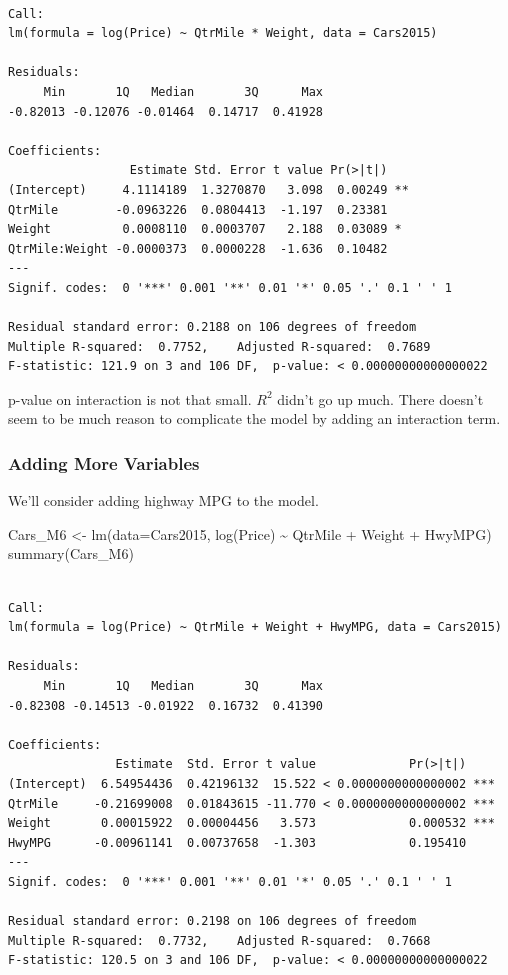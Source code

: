 \documentclass[
  letterpaper,
  DIV=11,
  numbers=noendperiod]{scrreprt}
\newenvironment{Shaded}{\begin{snugshade}}{\end{snugshade}}
\newcommand{\AttributeTok}[1]{\textcolor[rgb]{0.40,0.45,0.13}{#1}}
\newcommand{\FunctionTok}[1]{\textcolor[rgb]{0.28,0.35,0.67}{#1}}
\newcommand{\NormalTok}[1]{\textcolor[rgb]{0.00,0.23,0.31}{#1}}
\newcommand{\OtherTok}[1]{\textcolor[rgb]{0.00,0.23,0.31}{#1}}
\newcommand{\SpecialCharTok}[1]{\textcolor[rgb]{0.37,0.37,0.37}{#1}}
\begin{document}
\begin{verbatim}

Call:
lm(formula = log(Price) ~ QtrMile * Weight, data = Cars2015)

Residuals:
     Min       1Q   Median       3Q      Max 
-0.82013 -0.12076 -0.01464  0.14717  0.41928 

Coefficients:
                 Estimate Std. Error t value Pr(>|t|)   
(Intercept)     4.1114189  1.3270870   3.098  0.00249 **
QtrMile        -0.0963226  0.0804413  -1.197  0.23381   
Weight          0.0008110  0.0003707   2.188  0.03089 * 
QtrMile:Weight -0.0000373  0.0000228  -1.636  0.10482   
---
Signif. codes:  0 '***' 0.001 '**' 0.01 '*' 0.05 '.' 0.1 ' ' 1

Residual standard error: 0.2188 on 106 degrees of freedom
Multiple R-squared:  0.7752,    Adjusted R-squared:  0.7689 
F-statistic: 121.9 on 3 and 106 DF,  p-value: < 0.00000000000000022
\end{verbatim}

p-value on interaction is not that small. \(R^2\) didn't go up much.
There doesn't seem to be much reason to complicate the model by adding
an interaction term.

\subsubsection{Adding More Variables}\label{adding-more-variables}

We'll consider adding highway MPG to the model.

\begin{Shaded}
\begin{Highlighting}[]
\NormalTok{Cars\_M6 }\OtherTok{\textless{}{-}} \FunctionTok{lm}\NormalTok{(}\AttributeTok{data=}\NormalTok{Cars2015, }\FunctionTok{log}\NormalTok{(Price) }\SpecialCharTok{\textasciitilde{}}\NormalTok{ QtrMile }\SpecialCharTok{+}\NormalTok{ Weight }\SpecialCharTok{+}\NormalTok{ HwyMPG)}
\FunctionTok{summary}\NormalTok{(Cars\_M6)}
\end{Highlighting}
\end{Shaded}

\begin{verbatim}

Call:
lm(formula = log(Price) ~ QtrMile + Weight + HwyMPG, data = Cars2015)

Residuals:
     Min       1Q   Median       3Q      Max 
-0.82308 -0.14513 -0.01922  0.16732  0.41390 

Coefficients:
               Estimate  Std. Error t value             Pr(>|t|)    
(Intercept)  6.54954436  0.42196132  15.522 < 0.0000000000000002 ***
QtrMile     -0.21699008  0.01843615 -11.770 < 0.0000000000000002 ***
Weight       0.00015922  0.00004456   3.573             0.000532 ***
HwyMPG      -0.00961141  0.00737658  -1.303             0.195410    
---
Signif. codes:  0 '***' 0.001 '**' 0.01 '*' 0.05 '.' 0.1 ' ' 1

Residual standard error: 0.2198 on 106 degrees of freedom
Multiple R-squared:  0.7732,    Adjusted R-squared:  0.7668 
F-statistic: 120.5 on 3 and 106 DF,  p-value: < 0.00000000000000022
\end{verbatim}
\end{document}

